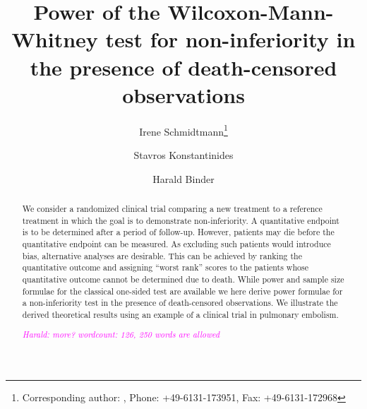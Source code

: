 \documentclass[bimj,fleqn]{w-art}\usepackage[]{graphicx}\usepackage[]{color}
\theoremstyle{plain}
\theoremstyle{definition}
\begin{document}


\title[Running title]{Power of the Wilcoxon-Mann-Whitney test for non-inferiority in the presence
of death-censored observations}
\author[Schmidtmann {\it{et al.}}]{Irene Schmidtmann\footnote{Corresponding author: {}, Phone: +49-6131-173951, Fax: +49-6131-172968}}
\address[\inst{1}]{Institute for Medical Biostatistics, Epidemiology and Informatics (IMBEI),
University Medical Center Johannes Gutenberg University Mainz, D 55101 Mainz}
\author[Konstantinides]{Stavros Konstantinides}
\address[\inst{2}]{Center for Thrombosis and Hemostasis (CTH), University Medical Center Johannes Gutenberg University Mainz, D 55101 Mainz}
\author[Binder]{Harald Binder}
\address[\inst{3}]{Institute for Medical Biometry and Statistics, University Freiburg, Stefan-Meier-Str. 26, D 79104 Freiburg}
  

\begin{abstract}
We consider a randomized clinical trial comparing a new treatment to a reference
treatment in which the goal is to demonstrate non-inferiority. A quantitative
endpoint is to be determined after a period of follow-up. However, patients may
die before the quantitative endpoint can be measured. As excluding such patients
would introduce bias, alternative analyses are desirable. This can be achieved
by ranking the quantitative outcome and assigning “worst rank” scores to the
patients whose quantitative outcome cannot be determined due to death. While
power and sample size formulae for the classical one-sided test are available we
here derive power formulae for a non-inferiority test in the presence of
death-censored observations. We illustrate the derived theoretical results using
an example of a clinical trial in pulmonary embolism.

\textcolor{magenta}{\textit{Harald: more? wordcount: 126, 250 words are allowed}}

\end{abstract}
\end{document}
